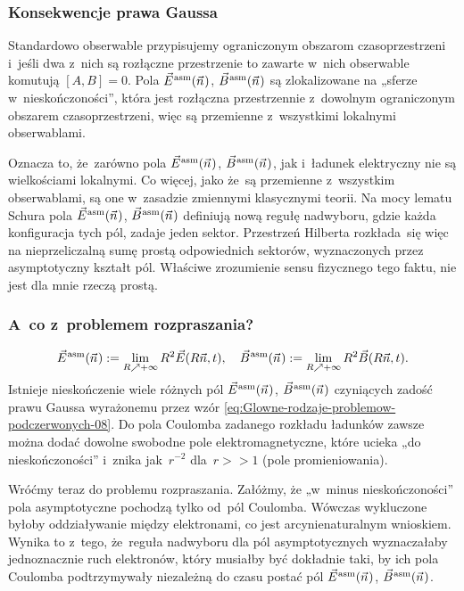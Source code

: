 \documentclass[10pt,t]{beamer}
\begin{document}
\begin{frame}
  \frametitle{Konsekwencje prawa Gaussa}


  Standardowo obserwable przypisujemy ograniczonym obszarom
  czasoprzestrzeni i~jeśli dwa z~nich są rozłączne przestrzenie to zawarte
  w~nich obserwable komutują $[ A, B ] = 0$. Pola $\vec{E}^{ \hspace{0.05em} \text{asm} }( \vec{n} \hspace{0.05em} )$,
  $\vec{B}^{ \hspace{0.05em} \text{asm} }( \vec{n} \hspace{0.05em} )$ są zlokalizowane na „sferze w~nieskończoności”, która jest
  rozłączna przestrzennie z~dowolnym ograniczonym obszarem
  czasoprzestrzeni, więc są przemienne z~wszystkimi lokalnymi obserwablami.

  Oznacza to, że~zarówno pola $\vec{E}^{ \hspace{0.05em} \text{asm} }( \vec{n} \hspace{0.05em} )$, $\vec{B}^{ \hspace{0.05em} \text{asm} }( \vec{n} \hspace{0.05em} )$, jak i~ładunek
  elektryczny \alert{nie} są wielkościami lokalnymi. Co więcej, jako
  że~są przemienne z~wszystkim obserwablami, są one w~zasadzie zmiennymi
  klasycznymi teorii. Na mocy lematu Schura pola $\vec{E}^{ \hspace{0.05em} \text{asm} }( \vec{n} \hspace{0.05em} )$, $\vec{B}^{ \hspace{0.05em} \text{asm} }( \vec{n} \hspace{0.05em} )$
  definiują nową regułę nadwyboru, gdzie każda konfiguracja tych pól,
  zadaje jeden sektor. Przestrzeń Hilberta rozkłada~się więc na
  \alert{nieprzeliczalną} sumę prostą odpowiednich sektorów, wyznaczonych
  przez asymptotyczny kształt pól. Właściwe zrozumienie sensu fizycznego
  tego faktu, nie jest dla mnie rzeczą prostą.

\end{frame}





\begin{frame}
  \frametitle{A~co z~problemem rozpraszania?}

  \vspace{-1.5em}


  \begin{equation}
    \label{eq:Glowne-rodzaje-problemow-podczerwonych-10}
    \vec{E}^{ \hspace{0.05em} \text{asm} }( \vec{n} \hspace{0.05em} ) :=
    \lim_{ R \nearrow +\infty } R^{ 2 } \vec{E}( R \vec{n}, t ), \quad
    \vec{B}^{ \hspace{0.05em} \text{asm} }( \vec{n} \hspace{0.05em} ) :=
    \lim_{ R \nearrow +\infty } R^{ 2 } \vec{B}( R \vec{n}, t ).
  \end{equation}
  Istnieje nieskończenie wiele różnych pól $\vec{E}^{ \hspace{0.05em} \text{asm} }( \vec{n} \hspace{0.05em} )$, $\vec{B}^{ \hspace{0.05em} \text{asm} }( \vec{n} \hspace{0.05em} )$
  czyniących zadość prawu Gaussa wyrażonemu przez wzór
  \eqref{eq:Glowne-rodzaje-problemow-podczerwonych-08}. Do pola Coulomba
  zadanego rozkładu ładunków zawsze można dodać dowolne swobodne pole
  elektromagnetyczne, które ucieka „do nieskończoności” i~znika
  jak~$r^{ -2 }$ dla~$r >> 1$ (pole promieniowania).

  Wróćmy teraz do problemu rozpraszania. Załóżmy, że „w~minus
  nieskończoności” pola asymptotyczne pochodzą \alert{tylko} od~pól
  Coulomba. Wówczas \alert{wykluczone} byłoby oddziaływanie między
  elektronami, co jest arcynienaturalnym wnioskiem. Wynika to z~tego,
  że~reguła nadwyboru dla pól asymptotycznych wyznaczałaby jednoznacznie
  ruch elektronów, który musiałby być dokładnie taki, by ich pola Coulomba
  podtrzymywały niezależną do czasu postać pól $\vec{E}^{ \hspace{0.05em} \text{asm} }( \vec{n} \hspace{0.05em} )$, $\vec{B}^{ \hspace{0.05em} \text{asm} }( \vec{n} \hspace{0.05em} )$.

\end{frame}
\end{document}
